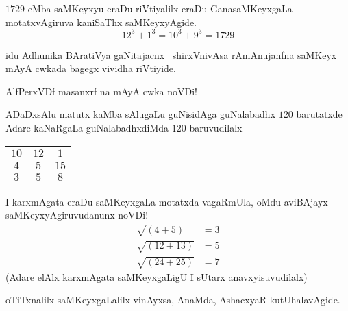 $1729$ eMba saMKeyxyu eraDu riVtiyalilx eraDu GanasaMKeyxgaLa motatxvAgiruva kaniSaThx saMKeyxyAgide.
$$
12^3 + 1^3 =10^3 + 9 ^3 = 1729
$$

idu Adhunika BAratiVya gaNitajacnx~ shirxVnivAsa rAmAnujanfna saMKeyx mAyA cwkada bagegx vividha riVtiyide.

AlfPerxVDf  masanxrf na mAyA cwka noVDi!

ADaDxsAlu matutx kaMba sAlugaLu guNisidAga guNalabadhx $120$ barutatxde Adare kaNaRgaLa guNalabadhxdiMda $120$ baruvudilalx
\begin{center}
\begin{tabular}{|c|c|c|}
\hline
$10$ & $12$ & $1$\\
\hline
$4$ & $5$ & $15$\\
\hline
$3$ & $5$ & $8$\\
\hline
\end{tabular}
\end{center}

I karxmAgata eraDu saMKeyxgaLa motatxda vagaRmUla, oMdu aviBAjayx saMKeyxyAgiruvudanunx noVDi!
\begin{align*}
  \sqrt{(4+5)} & = 3\\
  \sqrt{(12+13)} & = 5\\
  \sqrt{(24+25)} &= 7
\end{align*}
(Adare elAlx karxmAgata saMKeyxgaLigU I sUtarx anavxyisuvudilalx)

oTiTxnalilx saMKeyxgaLalilx vinAyxsa, AnaMda, AshacxyaR kutUhalavAgide. 



